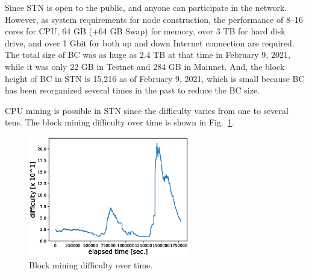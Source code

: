 \documentclass[graybox]{svmult}
\begin{document}
Since STN is open to the public, and anyone can participate in the network. 
However, as system requirements for node construction, the performance of 8--16 cores for CPU, 64 GB (+64 GB Swap) for memory, over 3 TB for hard disk drive, and over 1 Gbit for both up and down Internet connection are required.
The total size of BC was as huge as 2.4 TB at that time in February 9, 2021, while it was only 22 GB in Testnet and 284 GB in Mainnet. 
And, the block height of BC in STN is 15,216 as of February 9, 2021, which is small because BC has been reorganized several times in the past to reduce the BC size. 

CPU mining is possible in STN since the difficulty varies from one to several tens.
The block mining difficulty over time is shown in Fig.~\ref{fig:difficulty}.
%
\begin{figure}[t]
  \vspace{-35mm}
  \begin{center}
    \includegraphics[width=70mm]{time_vs_difficulty-plot.eps}
  \end{center}
  \vspace{35mm}
  \caption{Block mining difficulty over time.}
  \label{fig:difficulty}
\end{figure}
%
\end{document}
